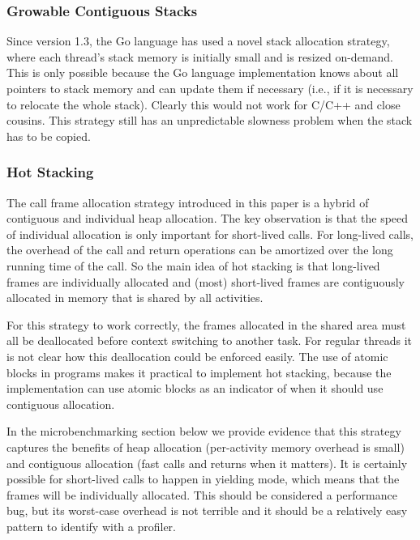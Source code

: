 \documentclass[sigplan,10pt,review,anonymous]{acmart}\settopmatter{printfolios=true,printccs=false,printacmref=false}
\begin{document}

\subsubsection{Growable Contiguous Stacks}

Since version 1.3, the Go language has used a novel stack allocation strategy, where each thread's stack memory is initially small and is resized on-demand.
This is only possible because the Go language implementation knows about all pointers to stack memory and can update them if necessary (i.e., if it is necessary to relocate the whole stack).
Clearly this would not work for C/C++ and close cousins.
This strategy still has an unpredictable slowness problem when the stack has to be copied.

\subsubsection{Hot Stacking}

The call frame allocation strategy introduced in this paper is a hybrid of contiguous and individual heap allocation.
The key observation is that the speed of individual allocation is only important for short-lived calls.
For long-lived calls, the overhead of the call and return operations can be amortized over the long running time of the call.
So the main idea of hot stacking is that long-lived frames are individually allocated and (most) short-lived frames are contiguously allocated in memory that is shared by all activities.

For this strategy to work correctly, the frames allocated in the shared area must all be deallocated before context switching to another task.
For regular threads it is not clear how this deallocation could be enforced easily.
The use of atomic blocks in programs makes it practical to implement hot stacking, because the implementation can use atomic blocks as an indicator of when it should use contiguous allocation.

In the microbenchmarking section below we provide evidence that this strategy captures the benefits of heap allocation (per-activity memory overhead is small) and contiguous allocation (fast calls and returns when it matters).
It is certainly possible for short-lived calls to happen in yielding mode, which means that the frames will be individually allocated.
This should be considered a performance bug, but its worst-case overhead is not terrible and it should be a relatively easy pattern to identify with a profiler.
\end{document}

